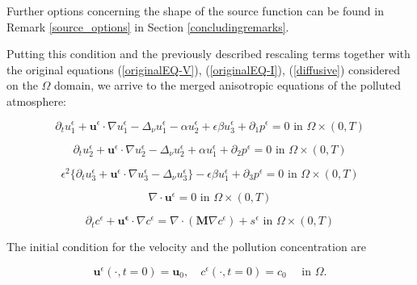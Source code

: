 \documentclass[12pt]{report}
\numberwithin{theorem}{chapter}
\numberwithin{corollary}{chapter}
\numberwithin{lemma}{chapter}
\numberwithin{remark}{chapter}
\numberwithin{definition}{chapter}
\numberwithin{prop}{chapter}
\begin{document}
Further options concerning the shape of the source function can be found in Remark \ref{source_options} in Section \ref{concludingremarks}.
    
Putting this condition and the previously described rescaling terms together with the original equations (\ref{originalEQ-V}), (\ref{originalEQ-I}), (\ref{diffusive}) considered on the $\Omega$ domain, we arrive to the merged anisotropic equations of the polluted atmosphere:
  
\begin{equation} \label{ANSC1_coordinates_GFC_intro}
  \partial_t u^\epsilon _1 + \mathbf{u}^\epsilon \cdot \nabla u^\epsilon _1 -\Delta_\nu u^\epsilon _1 -\alpha u_2^\epsilon + \epsilon \beta u_3^\epsilon + \partial_1 p^\epsilon = 0 \text{ in } \Omega \times (0,T)
\end{equation}

\begin{equation} \label{ANSC2_coordinates_GFC_intro}
  \partial_t u_2^\epsilon + \mathbf{u}^\epsilon \cdot \nabla u_2^\epsilon -\Delta_\nu u_2^\epsilon + \alpha u_1^\epsilon + \partial_2 p^\epsilon = 0 \text{ in } \Omega \times (0,T)
\end{equation}

\begin{equation} \label{ANSC3_coordinates_GFC_intro}
  \epsilon^2 \{  \partial_t u_3^\epsilon + \mathbf{u}^\epsilon \cdot \nabla u_3^\epsilon -\Delta_\nu u_3^{\epsilon} \} - \epsilon \beta u_1^\epsilon + \partial_3 p^\epsilon = 0 \text{ in } \Omega \times (0,T)
\end{equation}

\begin{equation} \label{ANSC4_coordinates_GFC_intro}
  \nabla \cdot \mathbf{u}^\epsilon= 0 \text{ in } \Omega \times (0,T)
\end{equation}

\begin{equation} \label{ANSC5_coordinates_GFC_intro}
  \partial_t c^\epsilon + \mathbf{u^\epsilon} \cdot \nabla c^\epsilon = \nabla \cdot (\mathbf{M} \nabla c^\epsilon) + s^\epsilon \text{ in } \Omega \times (0,T)
\end{equation}

The initial condition for the velocity and the pollution concentration are
    
\begin{equation} \label{ANSC_init_coordinates_GFC_intro}
  \mathbf{u}^\epsilon (\cdot, t = 0) = \mathbf{u}_0, \quad c^\epsilon (\cdot, t=0) = c_0  \quad \text{ in } \Omega.
\end{equation}
    
\end{document}
